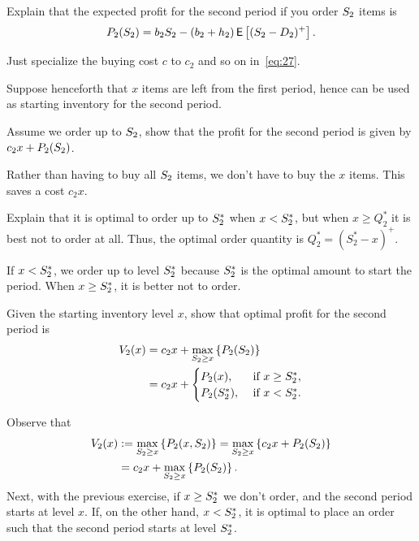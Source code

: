 \begin{exercise}
Explain that the  expected profit for the second period if you order $S_2$ items is
\begin{align}\label{eq:28}
P_2(S_2) = b_2 S_2 - (b_2+h_2)\,\mathsf{E}\left[(S_2-D_2)^+\right].
\end{align}
\begin{solution}
Just specialize the buying cost $c$ to $c_2$ and so on in~\eqref{eq:27}.
\end{solution}
\end{exercise}

Suppose henceforth that $x$ items are left from the first period, hence can be used as starting inventory for the second period.
  
\begin{exercise}
Assume we order up to $S_2$,  show that the profit for the second period is given by
$c_2 x + P_2(S_2)$.
\begin{solution}
Rather than having to buy all $S_2$ items, we don't have to buy the $x$ items. This saves a cost $c_2 x$. 
\end{solution}
\end{exercise}

\begin{exercise}
Explain that it is optimal to order up to $S_2^*$ when $x<S_2^*$, but when $x\geq 
Q_2^*$ it is best not to order at all. Thus, the optimal order quantity is $Q_2^* = (S_2^* - x)^+$.  
\begin{solution}
If $x<S_2^*$, we order up to level $S_2^*$ because $S_2^*$ is the optimal amount to start the period. When $x\geq S_2^*$, it is better not to order. 
\end{solution}
\end{exercise}

\begin{exercise}
Given the starting inventory level $x$, show that optimal profit  for the second period is
\begin{align}\label{eq:24}
V_2(x) & = c_2x + \max_{S_2\geq x} \left\{P_2(S_2)\right\} \notag \\
&= c_2x +
  \begin{cases}
    P_2(x), &\text{ if } x\geq S_2^*, \\
    P_2(S_2^*), &\text{ if } x<S_2^*.
  \end{cases}
\end{align}
\begin{solution} Observe that
\begin{align*}
V_2(x) 
&:=\max_{S_2\geq x} \left\{P_2(x,S_2)\right\} 
= \max_{S_2\geq x} \left\{c_2x + P_2(S_2)\right\} \\
& = c_2x + \max_{S_2\geq x} \left\{P_2(S_2)\right\}.
\end{align*}
Next, with the previous exercise, if $x\geq S_2^*$ we don't order, and the second period starts at level $x$. If, on the other hand, $x<S_2^*$, it is optimal to place an order such that the second period starts at level $S_2^*$.
\end{solution}
\end{exercise}

